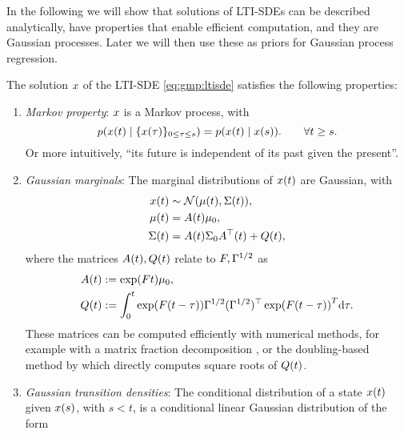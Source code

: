 \documentclass{mimosis}
\begin{document}
In the following we will show that solutions of LTI-SDEs can be described analytically, have properties that enable efficient computation, and they are Gaussian processes.
Later we will then use these as priors for Gaussian process regression.

\begin{proposition}
\label{prop:lti-solution-properties}
The solution \(x\) of the LTI-SDE \cref{eq:gmp:ltisde}
satisfies the following properties:
\begin{enumerate}
\item \emph{Markov property}:
\(x\) is a Markov process, with
\begin{equation}
\label{eq:gmp:markov}
\p(\st(t) \mid \{\st(\tau)\}_{0 \leq \tau \leq s}) = \p(\st(t) \mid \st(s)).
\qquad \forall t \geq s.
\end{equation}
Or more intuitively, ``its future is independent of its past given the present''.
\item \emph{Gaussian marginals}:
The marginal distributions of \(x(t)\) are Gaussian, with
\begin{subequations}
\label{eq:gpm:ltimeancov}
\begin{align}
  \st(t) &\sim \N(\mu(t), \Sigma(t)), \\
  \mu(t) &= \transA(t) \mu_0, \\
  \Sigma(t) &= \transA(t) \Sigma_0 \transA^\T(t) + \transC(t),
\end{align}
\end{subequations}
where the matrices \(A(t), Q(t)\) relate to \(F, \Gamma^{1/2}\) as
\begin{subequations}
\label{eq:gpm:transitionmatrices}
\begin{align}
  A(t) &:= \exp(F t) \mu_0, \\
  Q(t) &:= \int_0^t \exp(F (t-\tau)) \Gamma^{1/2} (\Gamma^{1/2})^\top \exp(F (t-\tau))^T \dd \tau.
\end{align}
\end{subequations}
These matrices can be computed efficiently with numerical methods,
for example with a matrix fraction decomposition
\parencite[Section 6.3]{sarkka_solin_2019},
or the doubling-based method by
\textcite{stillfjord2023computing} which directly computes square roots of \(Q(t)\).
\item \emph{Gaussian transition densities}:
The conditional distribution of a state \(x(t)\) given \(x(s)\), with \(s < t\), is a conditional linear Gaussian distribution of the form

\end{enumerate}
\end{proposition}
\end{document}

